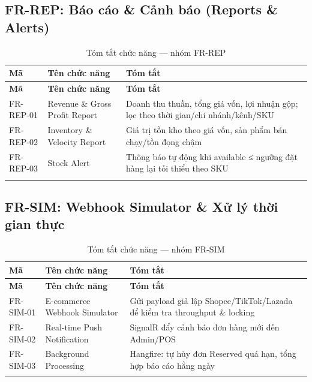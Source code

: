 \subsection{FR-REP: Báo cáo \& Cảnh báo (Reports \& Alerts)}

\begin{longtable}{|p{2cm}|p{4.5cm}|p{7cm}|}
    \hline
    \textbf{Mã} & \textbf{Tên chức năng} & \textbf{Tóm tắt} \\
    \hline
    \endfirsthead
    \hline
    \textbf{Mã} & \textbf{Tên chức năng} & \textbf{Tóm tắt} \\
    \hline
    \endhead
    FR-REP-01 & Revenue \& Gross Profit Report & Doanh thu thuần, tổng giá vốn, lợi nhuận gộp; lọc theo thời gian/chi nhánh/kênh/SKU \\
    \hline
    FR-REP-02 & Inventory \& Velocity Report & Giá trị tồn kho theo giá vốn, sản phẩm bán chạy/tồn đọng chậm \\
    \hline
    FR-REP-03 & Stock Alert & Thông báo tự động khi available ≤ ngưỡng đặt hàng lại tối thiểu theo SKU \\
    \hline
    \caption{Tóm tắt chức năng — nhóm FR-REP}
\end{longtable}

\subsection{FR-SIM: Webhook Simulator \& Xử lý thời gian thực}

\begin{longtable}{|p{2cm}|p{4.5cm}|p{7cm}|}
    \hline
    \textbf{Mã} & \textbf{Tên chức năng} & \textbf{Tóm tắt} \\
    \hline
    \endfirsthead
    \hline
    \textbf{Mã} & \textbf{Tên chức năng} & \textbf{Tóm tắt} \\
    \hline
    \endhead
    FR-SIM-01 & E-commerce Webhook Simulator & Gửi payload giả lập Shopee/TikTok/Lazada để kiểm tra throughput \& locking \\
    \hline
    FR-SIM-02 & Real-time Push Notification & SignalR đẩy cảnh báo đơn hàng mới đến Admin/POS \\
    \hline
    FR-SIM-03 & Background Processing & Hangfire: tự hủy đơn Reserved quá hạn, tổng hợp báo cáo hằng ngày \\
    \hline
    \caption{Tóm tắt chức năng — nhóm FR-SIM}
\end{longtable}
\FloatBarrier
